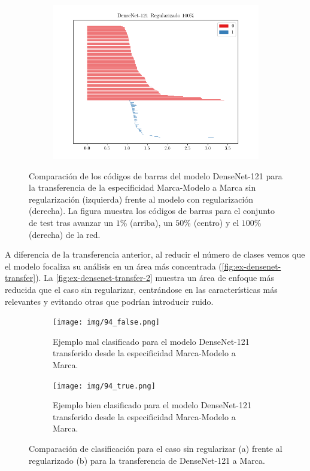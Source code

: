 \begin{figure}[H]
\begin{subfigure}
	\end{subfigure}%
	\begin{subfigure}
		{.5\textwidth}
		\centering
		\includegraphics[width=\linewidth]{img/bar_densenet_trans_reg_1.00.png}
	\end{subfigure}
	
	\caption{Comparación de los códigos de barras del modelo DenseNet-121 para la
		transferencia de la especificidad Marca-Modelo a Marca sin regularización (izquierda)
		frente al modelo con regularización (derecha). La figura muestra los códigos de
		barras para el conjunto de test tras avanzar un $1\%$ (arriba), un $50\%$ (centro)
		y el $100\%$ (derecha) de la red.}
	\label{fig:densenet-transfer-bc}
\end{figure}

A diferencia de la transferencia anterior, al reducir el número de clases vemos
que el modelo focaliza su análisis en un área más concentrada (\autoref{fig:ex-densenet-transfer}).
La \autoref{fig:ex-densenet-transfer-2} muestra un área de enfoque más reducida que
el caso sin regularizar, centrándose en las características más relevantes y
evitando otras que podrían introducir ruido.

\begin{figure}[H]
	\centering
	\begin{subfigure}
		{.45\textwidth}
		\centering
		\texttt{[image: img/94\_false.png]}
		\caption{Ejemplo mal clasificado para el modelo DenseNet-121 transferido
			desde la especificidad Marca-Modelo a Marca.}
		\label{fig:ex-densenet-transfer-1}
	\end{subfigure}%
	\qquad
	\begin{subfigure}
		{.45\textwidth}
		\centering
		\texttt{[image: img/94\_true.png]}
		\caption{Ejemplo bien clasificado para el modelo DenseNet-121 transferido
			desde la especificidad Marca-Modelo a Marca.}
		\label{fig:ex-densenet-transfer-2}
	\end{subfigure}
	\caption{Comparación de clasificación para el caso sin regularizar (a) frente
		al regularizado (b) para la transferencia de DenseNet-121 a Marca.}
	\label{fig:ex-densenet-transfer}
\end{figure}

